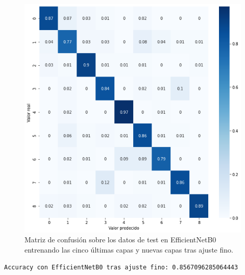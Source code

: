 \begin{figure}[H]
  \centering
  \includegraphics[width=0.5\linewidth]{Imagenes/entrenamiento_redes/5-ult/efficientnet_5fine_matriz.png}
  \caption{Matriz de confusión sobre los datos de test en EfficientNetB0 entrenando las cinco últimas capas y nuevas capas tras ajuste fino.}
\end{figure}


\begin{lstlisting}
Accuracy con EfficientNetB0 tras ajuste fino: 0.8567096285064443
\end{lstlisting}
